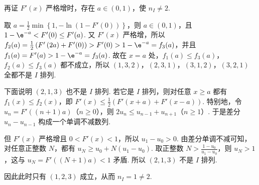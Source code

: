 \documentclass[UTF8,a4paper,oneside,11pt]{ctexbook}
\begin{document}
\begin{solution}
\begin{enumerate}
再证 \( F'(x) \) 严格增时，存在 \( a\in \left( 0,1 \right) \)，使 \( n_I\neq 2 \).

取 \( a=\frac{1}{2}\min\left\{ 1,-\ln\left( 1-F'(0) \right) \right\} \)，则 \( a\in \left( 0,1 \right) \)，且 \( 1-\e^{-a}<F'(0)\le F'(a) \). 又 \( F'(x) \) 严格增，所以 \( f_2(a)=\frac{1}{2}\left( F'\left( 2a \right)+F'(0) \right)>F'(0)>1-\e^{-a}=f_3(a) \)，并且 \( f_1(a)=F'(a)>1-\e^{-a}=f_3(a) \). 故在 \( x=a \) 处，\( f_1(a)\le f_3(a) \)，\( f_2(a)\le f_3(a) \) 都不成立，所以 \( \left( 1,3,2 \right) \)，\( \left( 2,3,1 \right) \)，\( \left( 3,1,2 \right) \)，\( \left( 3,2,1 \right) \) 全都不是 \(I\) 排列.

下面说明 \( \left( 2,1,3 \right) \) 也不是 \(I\) 排列. 若它是 \(I\) 排列，则对任意 \( x\ge a \) 都有 \( f_1(x)\le f_2(x) \)，即 \( F'(x)\le \frac{1}{2}\left( F'\left( x+a \right)+F'\left( x-a \right) \right) \). 特别地，令 \( u_n=F'\left( \left( n+1 \right)a \right) \)（\( n\ge 0 \)），则 \( 2u_n\le u_{n-1}+u_{n+1} \)（\( n\ge 1 \)）. 于是差分 \( u_n-u_{n-1} \) 构成一个单调不减数列.

但 \( F'(x) \) 严格增且 \( 0<F'(x)<1 \)，所以 \( u_1-u_0>0 \). 由差分单调不减可知，对任意正整数 \(N\)，都有 \( u_N\ge u_0+N\left( u_1-u_0 \right) \). 取正整数 \( N>\frac{1-u_0}{u_1-u_0} \)，则 \( u_N>1 \)，这与 \( u_N=F'\left( \left( N+1 \right)a \right)<1 \) 矛盾. 所以 \( \left( 2,1,3 \right) \) 不是 \(I\) 排列.

因此此时只有 \( \left( 1,2,3 \right) \) 成立，从而 \( n_I=1\neq 2 \).
\end{enumerate}
\end{solution}

\end{document}
